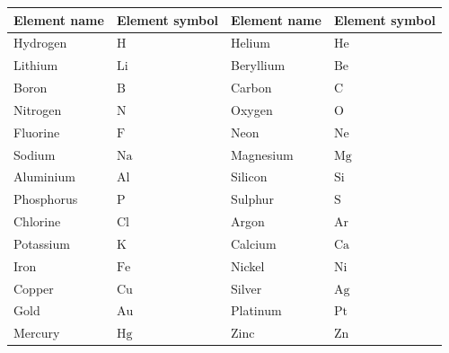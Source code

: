 \begin{tabular}{|l|l|l|l|}\hline
\textbf{Element name} & \textbf{Element symbol} & \textbf{Element name} & \textbf{Element symbol} \\ \hline
Hydrogen & $\mathrm{H}$ & Helium & $\mathrm{He}$ \\ \hline
Lithium & $\mathrm{Li}$ & Beryllium & $\mathrm{Be}$ \\ \hline
Boron & $\mathrm{B}$ & Carbon & $\mathrm{C}$ \\ \hline
Nitrogen & $\mathrm{N}$ & Oxygen & $\mathrm{O}$ \\ \hline
Fluorine & $\mathrm{F}$ & Neon & $\mathrm{Ne}$ \\ \hline
Sodium & $\mathrm{Na}$ & Magnesium & $\mathrm{Mg}$ \\ \hline
Aluminium & $\mathrm{Al}$ & Silicon & $\mathrm{Si}$ \\ \hline
Phosphorus & $\mathrm{P}$ & Sulphur & $\mathrm{S}$ \\ \hline
Chlorine & $\mathrm{Cl}$ & Argon & $\mathrm{Ar}$ \\ \hline
Potassium & $\mathrm{K}$ & Calcium & $\mathrm{Ca}$ \\ \hline
Iron & $\mathrm{Fe}$ & Nickel & $\mathrm{Ni}$ \\ \hline
Copper & $\mathrm{Cu}$ & Silver & $\mathrm{Ag}$ \\ \hline
Gold & $\mathrm{Au}$ & Platinum & $\mathrm{Pt}$ \\ \hline
Mercury & $\mathrm{Hg}$ & Zinc & $\mathrm{Zn}$ \\ \hline
\end{tabular}
\par
	\par
      \label{m38708*uid26}
